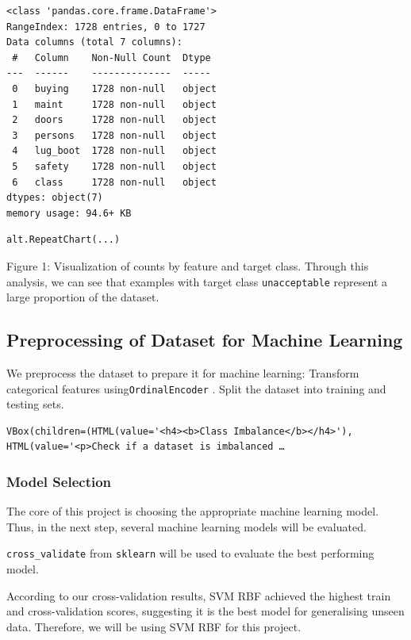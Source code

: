 \documentclass[
  letterpaper,
  DIV=11,
  numbers=noendperiod]{scrartcl}
\begin{document}
\begin{verbatim}
<class 'pandas.core.frame.DataFrame'>
RangeIndex: 1728 entries, 0 to 1727
Data columns (total 7 columns):
 #   Column    Non-Null Count  Dtype 
---  ------    --------------  ----- 
 0   buying    1728 non-null   object
 1   maint     1728 non-null   object
 2   doors     1728 non-null   object
 3   persons   1728 non-null   object
 4   lug_boot  1728 non-null   object
 5   safety    1728 non-null   object
 6   class     1728 non-null   object
dtypes: object(7)
memory usage: 94.6+ KB
\end{verbatim}

\begin{verbatim}
alt.RepeatChart(...)
\end{verbatim}

Figure 1: Visualization of counts by feature and target class. Through
this analysis, we can see that examples with target class
\texttt{unacceptable} represent a large proportion of the dataset.

\subsection{Preprocessing of Dataset for Machine
Learning}\label{preprocessing-of-dataset-for-machine-learning}

We preprocess the dataset to prepare it for machine learning: Transform
categorical features using\texttt{OrdinalEncoder} . Split the dataset
into training and testing sets.

\begin{verbatim}
VBox(children=(HTML(value='<h4><b>Class Imbalance</b></h4>'), HTML(value='<p>Check if a dataset is imbalanced …
\end{verbatim}

\subsubsection{Model Selection}\label{model-selection}

The core of this project is choosing the appropriate machine learning
model. Thus, in the next step, several machine learning models will be
evaluated.

\texttt{cross\_validate} from \texttt{sklearn} will be used to evaluate
the best performing model.

According to our cross-validation results, SVM RBF achieved the highest
train and cross-validation scores, suggesting it is the best model for
generalising unseen data. Therefore, we will be using SVM RBF for this
project.
\end{document}
